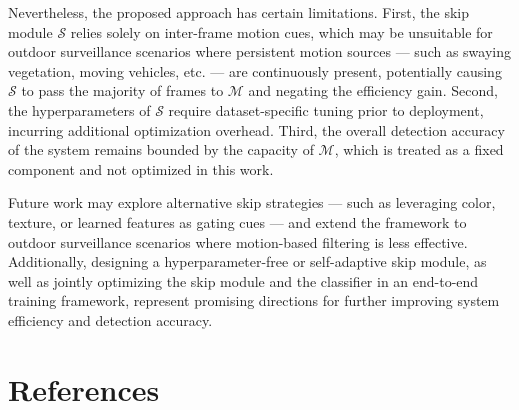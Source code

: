 \documentclass[
  10pt,
]{article}
\begin{document}
Nevertheless, the proposed approach has certain limitations. First, the
skip module \(\mathcal{S}\) relies solely on inter-frame motion cues,
which may be unsuitable for outdoor surveillance scenarios where
persistent motion sources --- such as swaying vegetation, moving
vehicles, etc. --- are continuously present, potentially causing
\(\mathcal{S}\) to pass the majority of frames to \(\mathcal{M}\) and
negating the efficiency gain. Second, the hyperparameters of
\(\mathcal{S}\) require dataset-specific tuning prior to deployment,
incurring additional optimization overhead. Third, the overall detection
accuracy of the system remains bounded by the capacity of
\(\mathcal{M}\), which is treated as a fixed component and not optimized
in this work.

Future work may explore alternative skip strategies --- such as
leveraging color, texture, or learned features as gating cues --- and
extend the framework to outdoor surveillance scenarios where
motion-based filtering is less effective. Additionally, designing a
hyperparameter-free or self-adaptive skip module, as well as jointly
optimizing the skip module and the classifier in an end-to-end training
framework, represent promising directions for further improving system
efficiency and detection accuracy.

\section*{References}\label{sec:references}
\end{document}
